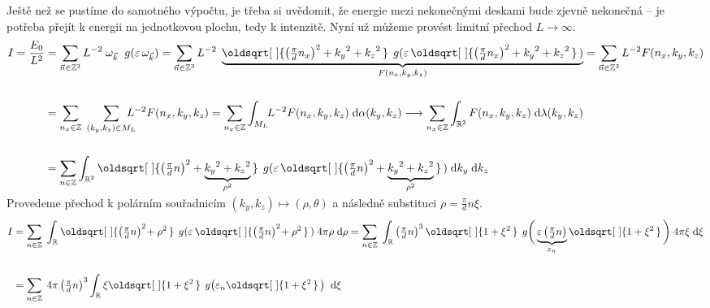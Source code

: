 \documentclass[10pt,a4paper]{article}
\renewcommand*{\sqrt}[2][\ ]{\oldsqrt[#1]{#2\,}\,}
\newcommand{\const}[1]{\text{#1}}
\renewcommand{\d}[1]{\;\const{d}#1}
\def\Z{\mathbb{Z}}
\def\R{\mathbb{R}}
\begin{document}
Ještě než se pustíme do samotného výpočtu, je třeba si uvědomit, že energie mezi nekonečnými deskami bude zjevně nekonečná – je potřeba přejít k energii na jednotkovou plochu, tedy k intenzitě. Nyní už můžeme provést limitní přechod $L \to \infty$.
\begin{align*}
    I = \frac{E_0}{L^2} &=
    \sum_{\vec n \in \Z^3}
    L^{-2} \;
    \omega_{\vec k} \;\;
    g(\varepsilon \, \omega_{\vec k})
    =
    \sum_{\vec n \in \Z^3}
    L^{-2} \;
    \underbrace{
        \sqrt{
            \left( \tfrac{\pi}{d} n_x \right)^2 +
            {k_y}^2 + {k_z}^2
        } \;
        g(\varepsilon \, \sqrt{\left( \tfrac{\pi}{d} n_x \right)^2 + {k_y}^2 + {k_z}^2})
    }_{
        F(n_x, k_y, k_z)
    }
    =
    \sum_{\vec n \in \Z^3} L^{-2} F(n_x, k_y, k_z)
    \\\\
    &=
    \sum_{n_x \in \Z} \;
    \sum_{(k_y, k_z) \in M_L}
    \hspace{-1em}
    L^{-2}
    F(n_x, k_y, k_z)
    =
    \sum_{n_x \in \Z}
    \int_{M_L} \!\!
    L^{-2} F(n_x, k_y, k_z)
    \d{\alpha}(k_y, k_z)
    \longrightarrow
    \sum_{n_x \in \Z}
    \int_{\R^2}
    F(n_x, k_y, k_z)
    \d{\lambda}(k_y, k_z)
    \\\\
    &=
    \sum_{n \in \Z}
    \int_{\R^2}
    \sqrt{
        \left( \tfrac{\pi}{d} n \right)^2 +
        \smash{\underbrace{
            {k_y}^2 + {k_z}^2
        }_{\rho^2}}
    } \;
    g(\varepsilon \, \sqrt{\left( \tfrac{\pi}{d} n \right)^2 +
        \smash{\underbrace{
            {k_y}^2 + {k_z}^2
        }_{\rho^2}}
    })
    \d{k_y} \d{k_z}
\end{align*}
Provedeme přechod k polárním souřadnicím $(k_y, k_z) \mapsto (\rho, \theta)$ a následně substituci $\rho = \tfrac{\pi}{d} n \xi$.
\begin{align*}
    I &=
    \sum_{n \in \Z} \;
    \int_{\R}
    \sqrt{
        \left( \tfrac{\pi}{d} n \right)^2
        \! + \rho^2
    } \;
    g(\varepsilon \, \sqrt{\left( \tfrac{\pi}{d} n \right)^2
        \! + \rho^2
    }) \;
    4\pi \rho \d{\rho}
    =
    \sum_{n \in \Z} \;
    \int_{\R}
    \left( \tfrac{\pi}{d} n \right)^3
    \sqrt{
        1 + \xi^2
    } \;
    g\bigg(
        \underbrace{
            \varepsilon \, \big( \tfrac{\pi}{d} n \big)
        }_{\varepsilon_n}
        \sqrt{1 + \xi^2}
    \bigg) \;
    4\pi \xi \d{\xi}
    \\\\
    &=
    \sum_{n \in \Z} \;
    4\pi
    \left( \tfrac{\pi}{d} n \right)^3
    \int_{\R}
    \xi
    \sqrt{
        1 + \xi^2
    } \;
    g\big(
        \varepsilon_n
        \sqrt{1 + \xi^2}
    \big) \;
    \d{\xi}
\end{align*}
\end{document}
